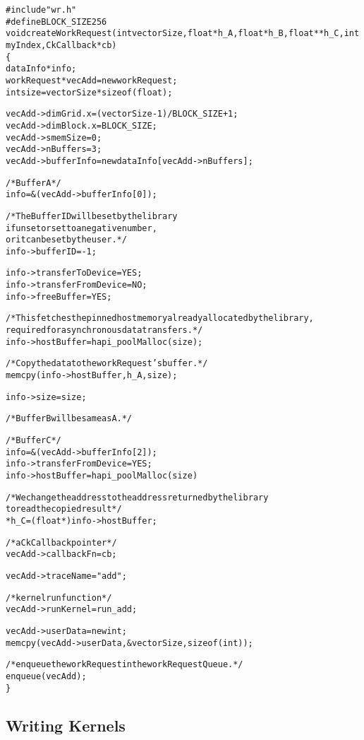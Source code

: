 \begin{alltt}
#include "wr.h"
#define BLOCK_SIZE 256
void createWorkRequest(int vectorSize, float *h_A, float *h_B, float **h_C, int myIndex, CkCallback *cb)
\{
    dataInfo *info;
    workRequest *vecAdd = new workRequest;
    int size = vectorSize * sizeof(float);

    vecAdd->dimGrid.x = (vectorSize - 1) / BLOCK_SIZE + 1;
    vecAdd->dimBlock.x = BLOCK_SIZE;
    vecAdd->smemSize = 0;
    vecAdd->nBuffers = 3;
    vecAdd->bufferInfo = new dataInfo[vecAdd->nBuffers];

    /* Buffer A */
    info = &(vecAdd->bufferInfo[0]);

    /* The Buffer ID will be set by the library
       if unset or set to a negative number,
       or it can be set by the user. */
    info->bufferID = -1;

    info->transferToDevice = YES;
    info->transferFromDevice = NO;
    info->freeBuffer = YES;

    /* This fetches the pinned host memory already allocated by the library,
       required for asynchronous data transfers. */
    info->hostBuffer = hapi_poolMalloc(size);

    /* Copy the data to the workRequest's buffer. */
    memcpy(info->hostBuffer, h_A, size);

    info->size = size;

    /* Buffer B will be same as A.*/

    /* Buffer C */
    info = &(vecAdd->bufferInfo[2]);
    info->transferFromDevice = YES;
    info->hostBuffer = hapi_poolMalloc(size)

    / * We change the address to the address returned by the library
        to read the copied result */
    *h_C = (float *)info->hostBuffer;

    /* a CkCallback pointer */
    vecAdd->callbackFn = cb;

    vecAdd->traceName = "add";

    /* kernel run function */
    vecAdd->runKernel = run_add;

    vecAdd->userData = new int;
    memcpy(vecAdd->userData, &vectorSize, sizeof(int));

    /* enqueue the workRequest in the workRequestQueue. */
    enqueue(vecAdd);
\}
\end{alltt}

\subsection{Writing Kernels}

